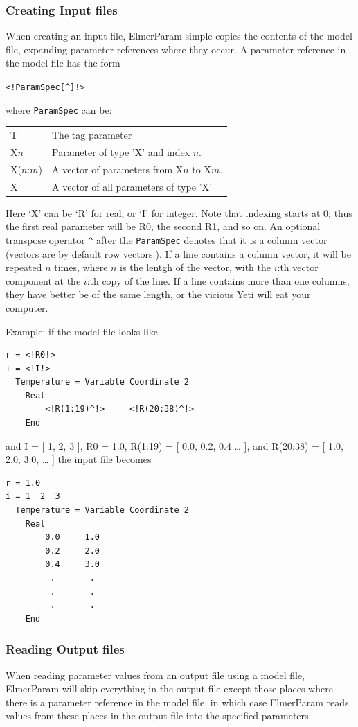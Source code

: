 \documentclass[12pt,a4paper]{article}
\newcommand{\ttbegin}{\begin{alltt}}
\newcommand{\ttend}{\end{alltt}}
\newcommand{\code}[1]{\texttt{#1}}
\begin{document}
\subsubsection{Creating Input files}
When creating an input file, ElmerParam simple copies the contents
of the model file, expanding parameter references where they occur.
A parameter reference in the model file has the form
\ttbegin
<!ParamSpec[\verb+^+]!>
\ttend
where \code{ParamSpec} can be:
\begin{table}[H]
\begin{tabular}{ll}
T           & The tag parameter\\
X$n$        & Parameter of type 'X' and index $n$.\\
X($n$:$m$)  & A vector of parameters from X$n$ to X$m$.\\
X           & A vector of all parameters of type 'X'\\
\end{tabular}
\end{table}
\noindent Here `X' can be `R' for real, or `I' for integer.  Note that
indexing starts at 0; thus the first real parameter will be R0, the second
R1, and so on.  An optional transpose operator \verb+^+ after the
\code{ParamSpec} denotes that it is a column vector (vectors are by default
row vectors.).  If a line contains a column vector, it will be repeated $n$
times, where $n$ is the lentgh of the vector, with the $i$:th vector
component at the $i$:th copy of the line.  If a line contains more than one
columns, they have better be of the same length, or the vicious Yeti will
eat your computer.

Example: if the model file looks like
\begin{verbatim}
r = <!R0!>
i = <!I!>
  Temperature = Variable Coordinate 2
    Real
        <!R(1:19)^!>     <!R(20:38)^!>
    End
\end{verbatim}
and I = [ 1, 2, 3 ], R0 = 1.0, R(1:19) = [ 0.0, 0.2, 0.4 \ldots{} ], and
R(20:38) = [ 1.0, 2.0, 3.0, \ldots{} ] the input file becomes
\begin{verbatim}
r = 1.0
i = 1  2  3
  Temperature = Variable Coordinate 2
    Real
        0.0     1.0
        0.2     2.0
        0.4     3.0
         .       .
         .       .
         .       .
    End
\end{verbatim}


\subsubsection{Reading Output files}
When reading parameter values from an output file using a model file,
ElmerParam will skip everything in the output file except those places
where there is a parameter reference in the model file, in which case
ElmerParam reads values from these places in the output file into the
specified parameters.
\end{document}
